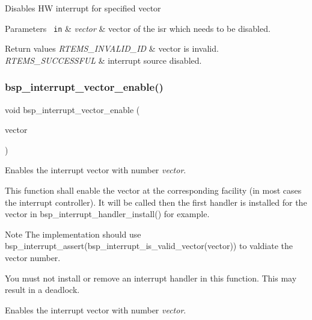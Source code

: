 Disables HW interrupt for specified vector


\begin{DoxyParams}[1]{Parameters}
\mbox{\texttt{ in}}  & {\em vector} & vector of the isr which needs to be disabled. \\
\hline
\end{DoxyParams}

\begin{DoxyRetVals}{Return values}
{\em R\+T\+E\+M\+S\+\_\+\+I\+N\+V\+A\+L\+I\+D\+\_\+\+ID} & vector is invalid. \\
\hline
{\em R\+T\+E\+M\+S\+\_\+\+S\+U\+C\+C\+E\+S\+S\+F\+UL} & interrupt source disabled. \\
\hline
\end{DoxyRetVals}
\mbox{\label{group__bsp__interrupt_ga9968f1703b04b05f4f7e9fc5220da39a}} 
\subsubsection{\texorpdfstring{bsp\_interrupt\_vector\_enable()}{bsp\_interrupt\_vector\_enable()}}
{\footnotesize\ttfamily void bsp\+\_\+interrupt\+\_\+vector\+\_\+enable (\begin{DoxyParamCaption}\item[{\mbox{\hyperlink{group__ClassicINTR_ga3e434c197d99f128e78cae4d9358bd8b}{rtems\+\_\+vector\+\_\+number}}}]{vector }\end{DoxyParamCaption})}



Enables the interrupt vector with number {\itshape vector}. 

This function shall enable the vector at the corresponding facility (in most cases the interrupt controller). It will be called then the first handler is installed for the vector in bsp\+\_\+interrupt\+\_\+handler\+\_\+install() for example.

\begin{DoxyNote}{Note}
The implementation should use bsp\+\_\+interrupt\+\_\+assert(bsp\+\_\+interrupt\+\_\+is\+\_\+valid\+\_\+vector(vector)) to valdiate the vector number.

You must not install or remove an interrupt handler in this function. This may result in a deadlock.
\end{DoxyNote}
Enables the interrupt vector with number {\itshape vector}.

